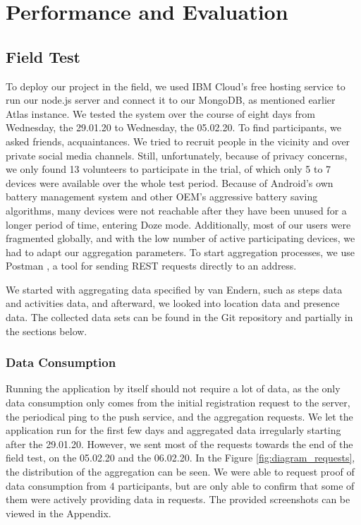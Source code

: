 
\chapter{Performance and Evaluation}\label{chapter:evaluation}
\section{Field Test}\label{sec:field_test}
To deploy our project in the field, we used IBM Cloud's free hosting service to run our node.js server and connect it to our MongoDB, as mentioned earlier Atlas instance. We tested the system over the course of eight days from Wednesday, the 29.01.20 to Wednesday, the 05.02.20. To find participants, we asked friends, acquaintances. We tried to recruit people in the vicinity and over private social media channels. Still, unfortunately, because of privacy concerns, we only found 13 volunteers to participate in the trial, of which only 5 to 7 devices were available over the whole test period. Because of Android's own battery management system and other OEM's aggressive battery saving algorithms, many devices were not reachable after they have been unused for a longer period of time, entering Doze mode. Additionally, most of our users were fragmented globally, and with the low number of active participating devices, we had to adapt our aggregation parameters. To start aggregation processes, we use Postman \cite{postman}, a tool for sending REST requests directly to an address.

We started with aggregating data specified by van Endern, such as steps data and activities data, and afterward, we looked into location data and presence data. The collected data sets can be found in the Git repository \cite{results} and partially in the sections below.

\subsection{Data Consumption}
Running the application by itself should not require a lot of data, as the only data consumption only comes from the initial registration request to the server, the periodical ping to the push service, and the aggregation requests. We let the application run for the first few days and aggregated data irregularly starting after the 29.01.20. However, we sent most of the requests towards the end of the field test, on the 05.02.20 and the 06.02.20. In the Figure \ref{fig:diagram_requests}, the distribution of the aggregation can be seen. We were able to request proof of data consumption from 4 participants, but are only able to confirm that some of them were actively providing data in requests. The provided screenshots can be viewed in the Appendix. 

